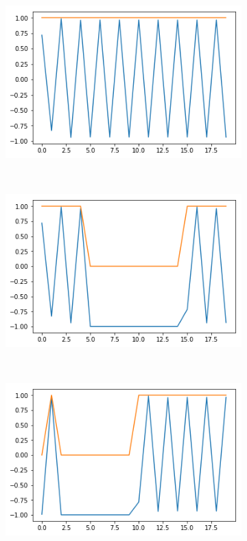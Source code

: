 \documentclass[12pt, letterpaper]{article}
\begin{document}
\begin{figure}[H]
    \centering
    \begin{subfigure}[b]{0.3\textwidth}
        \includegraphics[width=\textwidth]{fo_c1}
        \label{fig:gull}
    \end{subfigure}
    ~ %
    \begin{subfigure}[b]{0.3\textwidth}
        \includegraphics[width=\textwidth]{fo_c2}
        \label{fig:tiger}
    \end{subfigure}
    ~ %
    \begin{subfigure}[b]{0.3\textwidth}
        \includegraphics[width=\textwidth]{fo_c3}

\end{subfigure}
\end{figure}
\end{document}
